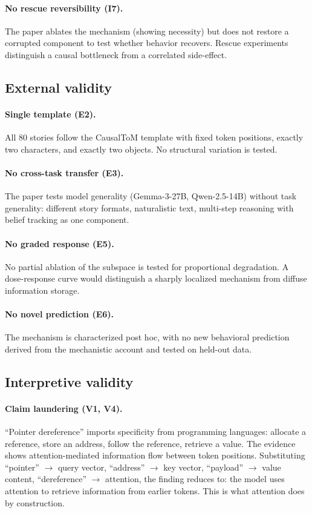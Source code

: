 \documentclass[11pt]{article}
\begin{document}
\paragraph{No rescue reversibility (I7).}
The paper ablates the mechanism (showing necessity) but does not restore a corrupted component to test whether behavior recovers. Rescue experiments distinguish a causal bottleneck from a correlated side-effect.

\subsection{External validity}

\paragraph{Single template (E2).}
All 80 stories follow the CausalToM template with fixed token positions, exactly two characters, and exactly two objects. No structural variation is tested.

\paragraph{No cross-task transfer (E3).}
The paper tests model generality (Gemma-3-27B, Qwen-2.5-14B) without task generality: different story formats, naturalistic text, multi-step reasoning with belief tracking as one component.

\paragraph{No graded response (E5).}
No partial ablation of the subspace is tested for proportional degradation. A dose-response curve would distinguish a sharply localized mechanism from diffuse information storage.

\paragraph{No novel prediction (E6).}
The mechanism is characterized post hoc, with no new behavioral prediction derived from the mechanistic account and tested on held-out data.

\subsection{Interpretive validity}

\paragraph{Claim laundering (V1, V4).}
``Pointer dereference'' imports specificity from programming languages: allocate a reference, store an address, follow the reference, retrieve a value. The evidence shows attention-mediated information flow between token positions. Substituting ``pointer'' $\rightarrow$ query vector, ``address'' $\rightarrow$ key vector, ``payload'' $\rightarrow$ value content, ``dereference'' $\rightarrow$ attention, the finding reduces to: the model uses attention to retrieve information from earlier tokens. This is what attention does by construction.
\end{document}
